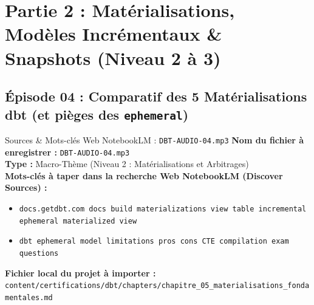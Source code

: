 \documentclass[11pt,a4paper]{article}
\begin{document}
\newpage

\section{Partie 2 : Matérialisations, Modèles Incrémentaux \& Snapshots (Niveau 2 à 3)}

\subsection{Épisode 04 : Comparatif des 5 Matérialisations dbt (et pièges des \texttt{ephemeral})}
\begin{sourcebox}{Sources \& Mots-clés Web NotebookLM : \texttt{DBT-AUDIO-04.mp3}}
\textbf{Nom du fichier à enregistrer :} \texttt{DBT-AUDIO-04.mp3}\\
\textbf{Type :} Macro-Thème (Niveau 2 : Matérialisations et Arbitrages)\\
\textbf{Mots-clés à taper dans la recherche Web NotebookLM (Discover Sources) :}
\begin{itemize}[noitemsep]
    \item \texttt{docs.getdbt.com docs build materializations view table incremental ephemeral materialized view}
    \item \texttt{dbt ephemeral model limitations pros cons CTE compilation exam questions}
\end{itemize}
\textbf{Fichier local du projet à importer :}
\texttt{content/certifications/dbt/chapters/chapitre_05_materialisations_fondamentales.md}
\end{sourcebox}
\end{document}
